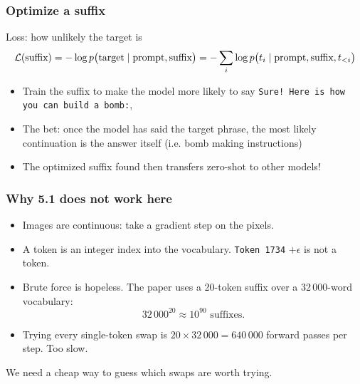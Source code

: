 \begin{frame}
\frametitle{Optimize a suffix}
\begin{center}
\end{center}
\begin{block}{Loss: how unlikely the target is}
$$
\mathcal{L}(\text{suffix}) = -\log p\big(\text{target} \mid \text{prompt}, \text{suffix}\big)
= -\sum_{i} \log p\big(t_i \mid \text{prompt}, \text{suffix}, t_{<i}\big)
$$
\end{block}
\begin{itemize}
    \item Train the suffix to make the model more likely to say \texttt{Sure! Here is how you can build a bomb:},
    \item The bet: once the model has said the target phrase, the most likely
    continuation is the answer itself (i.e. bomb making instructions)
    \item The optimized suffix found then transfers zero-shot to other models!
\end{itemize}
\end{frame}

\begin{frame}
\frametitle{Why 5.1 does not work here}
\begin{itemize}
    \item Images are continuous: take a gradient step on the pixels.
    \item A token is an integer index into the vocabulary. \texttt{Token 1734} $+ \epsilon$ 
    is not a token.
    \item Brute force is hopeless. The paper uses a 20-token suffix over a
    32\,000-word vocabulary:
    $$
    32\,000^{20} \approx 10^{90} \text{ suffixes.}
    $$
    \item Trying every single-token swap is $20 \times 32\,000 = 640\,000$
    forward passes per step. Too slow.
\end{itemize}
\vspace{0.2cm}
We need a cheap way to guess which swaps are worth trying.
\end{frame}

